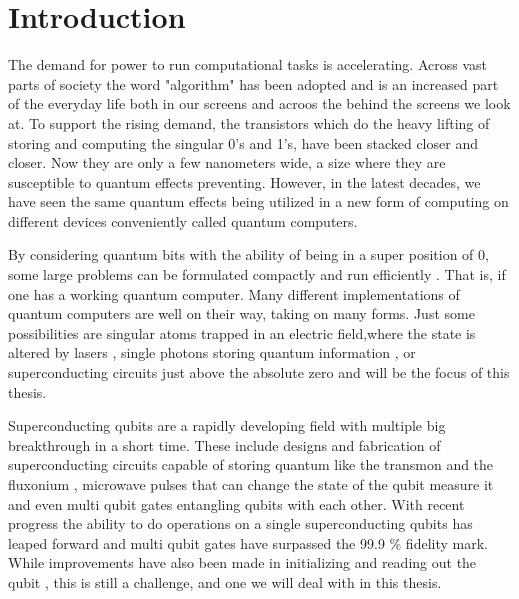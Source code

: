 \chapter{Introduction}\label{chap:Introduction}
The demand for power to run computational tasks is accelerating. Across vast parts of society the word "algorithm" has been adopted and is an increased part of the everyday life both in our screens and acroos the behind the screens we look at. To support the rising demand, the transistors which do the heavy lifting of storing and computing the singular 0's and 1's, have been stacked closer and closer. Now they are only a few nanometers wide, a size where they are susceptible to quantum effects preventing\cite{morton_embracing_2011}. However, in the latest decades, we have seen the same quantum effects being utilized in a new form of computing on different devices conveniently called quantum computers. 

By considering quantum bits with the ability of being in a super position of 0, some large problems can be formulated compactly and run efficiently \cite{preskill_quantum_2018}. That is, if one has a working quantum computer. Many different implementations of quantum computers are well on their way, taking on many forms. Just some possibilities are  singular atoms trapped in an electric field,where the state is altered by lasers \cite{brown_co-designing_2016}, single photons storing quantum information \cite{obrien_optical_2007}, or superconducting circuits just above the absolute zero \cite{krantz_quantum_2019} and will be the focus of this thesis.

Superconducting qubits are a rapidly developing field with multiple big breakthrough in a short time. These include designs and fabrication of superconducting circuits capable of storing quantum like the transmon \cite{koch_charge_2007} and the fluxonium \cite{manucharyan_fluxonium_2009}, microwave pulses that can change the state of the qubit measure it\cite{motzoi_simple_2009} and even multi qubit gates entangling qubits with each other\cite{yan_tunable_2018}. With recent progress the ability to do operations on a single superconducting qubits \cite{barends_superconducting_2014} has leaped forward and multi qubit gates have surpassed the 99.9 \% fidelity mark\cite{ding_high-fidelity_2023}. While improvements have also been made in initializing and reading out the qubit \cite{walter_rapid_2017, swiadek_enhancing_2023}, this is still a challenge, and one we will deal with in this thesis.

